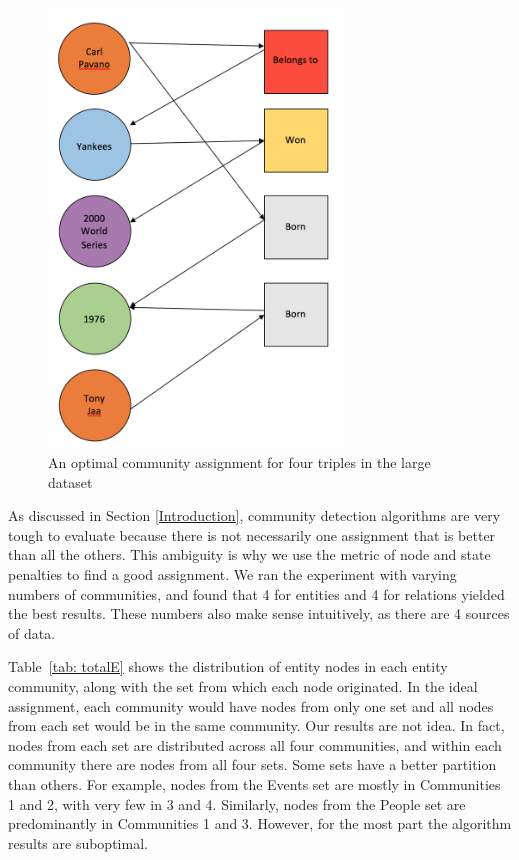 \documentclass[12pt]{article}
\begin{document}
\begin{figure}[t!]
    \centering
    \includegraphics[width=0.7\textwidth,keepaspectratio]{figures/total_dataset_graph.png}
    \caption{An optimal community assignment for four triples in the large dataset}
    \label{fig: total}
\end{figure}

As discussed in Section \ref{Introduction}, community detection algorithms are
very tough to evaluate because there is not necessarily one assignment that is
better than all the others. This ambiguity is why we use the metric of node and
state penalties to find a good assignment. We ran the experiment with varying
numbers of communities, and found that 4 for entities and 4 for relations
yielded the best results. These numbers also make sense intuitively, as there
are 4 sources of data.

Table~\ref{tab: totalE} shows the distribution of entity nodes in each entity
community, along with the set from which each node originated. In the ideal
assignment, each community would have nodes from only one set and all nodes
from each set would be in the same community. Our results are not idea. In fact,
nodes from each set are distributed across all four communities, and within each
community there are nodes from all four sets. Some sets have a better partition
than others. For example, nodes from the Events set are mostly in Communities
1 and 2, with very few in 3 and 4. Similarly, nodes from the People set are
predominantly in Communities 1 and 3. However, for the most part the algorithm
results are suboptimal.
\end{document}
